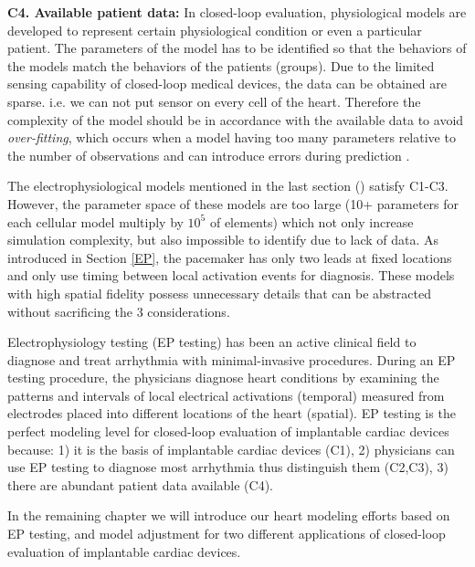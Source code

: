 \textbf{C4. Available patient data: } In closed-loop evaluation, physiological models are developed to represent certain physiological condition or even a particular patient. The parameters of the model has to be identified so that the behaviors of the models match the behaviors of the patients (groups).  Due to the limited sensing capability of closed-loop medical devices, the data can be obtained are sparse. i.e. we can not put sensor on every cell of the heart. Therefore the complexity of the model should be in accordance with the available data to avoid \emph{over-fitting}, which occurs when a model having too many parameters relative to the number of observations and can introduce errors during prediction . 

The electrophysiological models mentioned in the last section (\cite{natalia,Grosu_MHA}) satisfy C1-C3. However, the parameter space of these models are too large (10+ parameters for each cellular model multiply by $10^5$ of elements) which not only increase simulation complexity, but also impossible to identify due to lack of data. As introduced in Section \ref{EP}, the pacemaker has only two leads at fixed locations and only use timing between local activation events for diagnosis. These models with high spatial fidelity possess unnecessary details that can be abstracted without sacrificing the 3 considerations.

Electrophysiology testing (EP testing) has been an active clinical field to diagnose and treat arrhythmia with minimal-invasive procedures. During an EP testing procedure, the physicians diagnose heart conditions by examining the patterns and intervals of local electrical activations (temporal) measured from electrodes placed into different locations of the heart (spatial). EP testing is the perfect modeling level for closed-loop evaluation of implantable cardiac devices because: 1) it is the basis of implantable cardiac devices (C1), 2) physicians can use EP testing to diagnose most arrhythmia thus distinguish them (C2,C3), 3) there are abundant patient data available (C4). 

In the remaining chapter we will introduce our heart modeling efforts based on EP testing, and model adjustment for two different applications of closed-loop evaluation of implantable cardiac devices.




